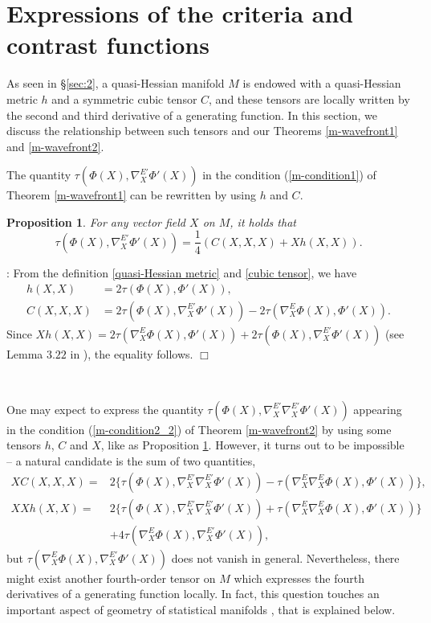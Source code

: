 \documentclass[10pt]{amsart}
\def\qed{\hfill $\Box$}
\def\proof{\noindent {\sl Proof} :\;  }
\def\qed{\hfill $\Box$}
\def\proof{\noindent {\sl Proof} :\;  }
\newtheorem{prop}[thm]{\bf Proposition}
\begin{document}
\section{ Expressions of the criteria and contrast functions}\label{sec:expression of criteria}
As seen in \S \ref{sec:2}, a quasi-Hessian manifold $M$ is endowed with a quasi-Hessian metric $h$ and a symmetric cubic tensor $C$, and these tensors are locally written by the second and third derivative of a generating function. 
In this section, we discuss the relationship between such tensors and our Theorems \ref{m-wavefront1} and \ref{m-wavefront2}. 

The quantity $\tau(\Phi(X), \nabla^{E'}_X\Phi'(X))$ in the condition (\ref{m-condition1}) of Theorem \ref{m-wavefront1} can be rewritten by using $h$ and $C$.

\begin{prop}\label{criterion tensor}
For any vector field $X$ on $M$, it holds that
$$
\tau(\Phi(X), \nabla^{E'}_X\Phi'(X)) = \frac{1}{4}\left(C(X, X, X) + Xh(X, X)\right).
$$
\end{prop}
\proof
From the definition \ref{quasi-Hessian metric} and \ref{cubic tensor}, we have
\begin{align*}
h(X, X) &= 2\tau(\Phi(X), \Phi'(X)),\\
C(X, X, X) &= 2\tau(\Phi(X), \nabla^{E'}_X\Phi'(X)) - 2\tau(\nabla^E_X\Phi(X), \Phi'(X)).
\end{align*}
Since 
$Xh(X, X) = 2\tau(\nabla^E_X\Phi(X), \Phi'(X)) + 2\tau(\Phi(X), \nabla^{E'}_X\Phi'(X))$
(see Lemma $3.22$ in \cite{NT}), the equality follows. \qed

\

One may expect to express the quantity $\tau(\Phi(X), \nabla^{E'}_X\nabla^{E'}_X\Phi'(X))$ appearing in the condition (\ref{m-condition2_2}) of Theorem \ref{m-wavefront2} by using some tensors $h$, $C$ and $X$, like as Proposition \ref{criterion tensor}.
However, it turns out to be impossible -- a natural candidate is the sum of two quantities, 
\begin{align*}
XC(X,X,X) = &2\{\tau(\Phi(X), \nabla^{E'}_X\nabla^{E'}_X\Phi'(X)) - \tau(\nabla^{E}_X\nabla^{E}_X\Phi(X), \Phi'(X))\},\\
XXh(X, X) = &2\{\tau(\Phi(X), \nabla^{E'}_X\nabla^{E'}_X\Phi'(X)) + \tau(\nabla^{E}_X\nabla^{E}_X\Phi(X), \Phi'(X))\}\\
&+ 4\tau(\nabla^E_X\Phi(X), \nabla^{E'}_X\Phi'(X))\nonumber,
\end{align*}
but $\tau(\nabla^E_X\Phi(X), \nabla^{E'}_X\Phi'(X))$ does not vanish in general. 
Nevertheless, there might exist another fourth-order tensor on $M$ which expresses the fourth derivatives of a generating function locally. 
In fact, this question touches an important aspect of geometry of statistical manifolds \cite{Eguchi, CMP, Matsuzoe1999}, that is explained below.
\end{document}
